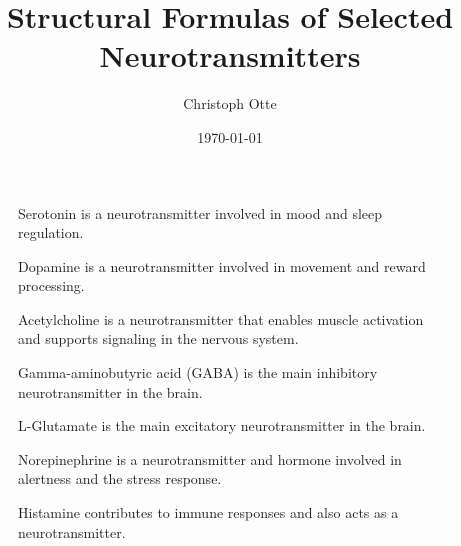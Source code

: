 \documentclass{scrartcl}
\title{Structural Formulas of Selected Neurotransmitters}
\author{Christoph Otte}
\date{\today}
\begin{document}
\maketitle

\begin{figure}[htbp]
  \centering
  
  \caption{Serotonin is a neurotransmitter involved in mood and sleep regulation.}
\end{figure}

\begin{figure}[htbp]
  \centering
  
  \caption{Dopamine is a neurotransmitter involved in movement and reward processing.}
\end{figure}

\begin{figure}[htbp]
  \centering
  
  \caption{Acetylcholine is a neurotransmitter that enables muscle activation and supports signaling in the nervous system.}
\end{figure}

\begin{figure}[htbp]
  \centering
  
  \caption{Gamma-aminobutyric acid (GABA) is the main inhibitory neurotransmitter in the brain.}
\end{figure}

\begin{figure}[htbp]
  \centering
  
  \caption{L-Glutamate is the main excitatory neurotransmitter in the brain.}
\end{figure}

\begin{figure}[htbp]
  \centering
  
  \caption{Norepinephrine is a neurotransmitter and hormone involved in alertness and the stress response.}
\end{figure}

\begin{figure}[htbp]
  \centering
  
  \caption{Histamine contributes to immune responses and also acts as a neurotransmitter.}
\end{figure}
\end{document}
